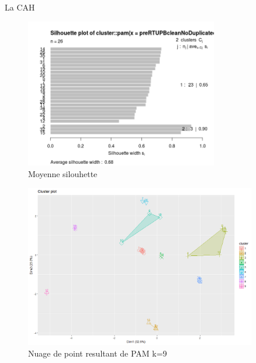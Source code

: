 La CAH 


\begin{figure}[H]
\centering
\includegraphics[width=0.75\textwidth]{../Fig/RTUPB/rtupb-sil-k2-pre}
\caption{Moyenne silouhette }
\end{figure}



\begin{figure}[H]
\centering
\includegraphics[width=0.90\textwidth]{../Fig/RTUPB/rtupb-pam-k9.png}
\caption{Nuage de point resultant de PAM k=9 }
\end{figure}

